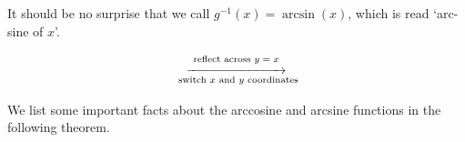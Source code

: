 \documentclass[12pt]{ximera}
\begin{document}
It should be no surprise that we call $g^{-1}(x) = \arcsin(x)$, which is read `arc-sine of $x$'. 

\[ \begin{array}{ccc}



&

\stackrel{\stackrel{\mbox{\scriptsize reflect across $y=x$}}{\xrightarrow{\hspace{1in}}}}{\mbox{ \scriptsize switch $x$ and $y$ coordinates}} 

&



\end{array}\]

We list some important facts about the arccosine and arcsine functions in the following theorem. 

\smallskip

\end{document}
